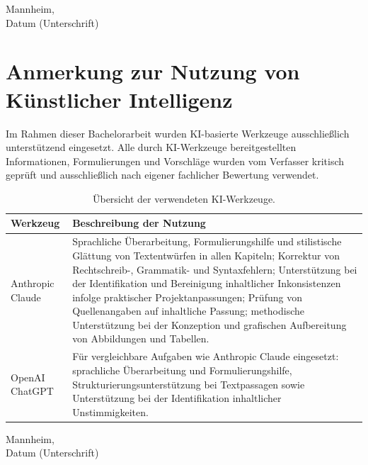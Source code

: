 \documentclass[12pt,a4paper]{article}
\begin{document}
\vspace{2cm}
\noindent Mannheim, \underline{\hspace{4cm}} \hfill \underline{\hspace{5cm}}\\
\hspace*{4.5cm} Datum \hfill (Unterschrift)

\newpage
\section*{Anmerkung zur Nutzung von Künstlicher Intelligenz}

Im Rahmen dieser Bachelorarbeit wurden KI-basierte Werkzeuge ausschließlich unterstützend eingesetzt. Alle durch KI-Werkzeuge bereitgestellten Informationen, Formulierungen und Vorschläge wurden vom Verfasser kritisch geprüft und ausschließlich nach eigener fachlicher Bewertung verwendet.

\begin{table}[H]
\centering
\caption[Übersicht der verwendeten KI-Werkzeuge]{Übersicht der verwendeten KI-Werkzeuge.}
\label{tab:ki-vermerk}
\small
\begin{tabular}{p{3.2cm}p{10.5cm}}
\toprule
\textbf{Werkzeug} & \textbf{Beschreibung der Nutzung} \\
\midrule
Anthropic Claude &
Sprachliche Überarbeitung, Formulierungshilfe und stilistische Glättung
von Textentwürfen in allen Kapiteln; Korrektur von Rechtschreib-,
Grammatik- und Syntaxfehlern; Unterstützung bei der Identifikation und
Bereinigung inhaltlicher Inkonsistenzen infolge praktischer
Projektanpassungen; Prüfung von Quellenangaben auf inhaltliche Passung;
methodische Unterstützung bei der Konzeption und grafischen Aufbereitung
von Abbildungen und Tabellen. \\
\addlinespace
OpenAI ChatGPT &
Für vergleichbare Aufgaben wie Anthropic Claude eingesetzt: sprachliche
Überarbeitung und Formulierungshilfe, Strukturierungsunterstützung bei
Textpassagen sowie Unterstützung bei der Identifikation inhaltlicher
Unstimmigkeiten. \\
\bottomrule
\end{tabular}
\end{table}

\vspace{1cm}
\noindent Mannheim, \underline{\hspace{4cm}} \hfill \underline{\hspace{5cm}}\\
\hspace*{4.5cm} Datum \hfill (Unterschrift)
\end{document}
